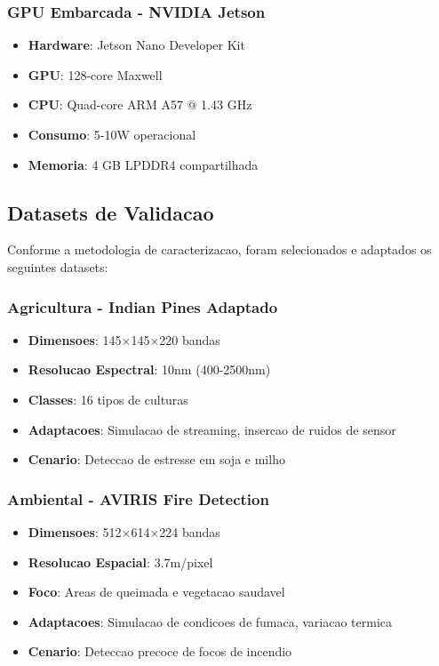 \subsubsection{GPU Embarcada - NVIDIA Jetson}
\begin{itemize}
    \item \textbf{Hardware}: Jetson Nano Developer Kit
    \item \textbf{GPU}: 128-core Maxwell
    \item \textbf{CPU}: Quad-core ARM A57 @ 1.43 GHz
    \item \textbf{Consumo}: 5-10W operacional
    \item \textbf{Memoria}: 4 GB LPDDR4 compartilhada
\end{itemize}

\subsection{Datasets de Validacao}

Conforme a metodologia de caracterizacao, foram selecionados e adaptados os seguintes datasets:

\subsubsection{Agricultura - Indian Pines Adaptado}
\begin{itemize}
    \item \textbf{Dimensoes}: 145×145×220 bandas
    \item \textbf{Resolucao Espectral}: 10nm (400-2500nm)
    \item \textbf{Classes}: 16 tipos de culturas
    \item \textbf{Adaptacoes}: Simulacao de streaming, insercao de ruidos de sensor
    \item \textbf{Cenario}: Deteccao de estresse em soja e milho
\end{itemize}

\subsubsection{Ambiental - AVIRIS Fire Detection}
\begin{itemize}
    \item \textbf{Dimensoes}: 512×614×224 bandas
    \item \textbf{Resolucao Espacial}: 3.7m/pixel
    \item \textbf{Foco}: Areas de queimada e vegetacao saudavel
    \item \textbf{Adaptacoes}: Simulacao de condicoes de fumaca, variacao termica
    \item \textbf{Cenario}: Deteccao precoce de focos de incendio
\end{itemize}

